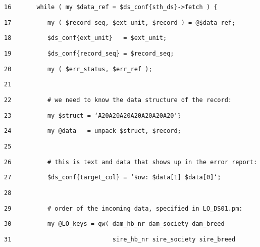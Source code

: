 \begin{table}[htbp]
\texttt{\scriptsize 16~~~~~~ while ( my \$data\_ref = \$ds\_conf\{sth\_ds\}->fetch
) \{}{\scriptsize \par}

\texttt{\scriptsize 17~~~~~~~~~ my ( \$record\_seq, \$ext\_unit,
\$record ) = @\$data\_ref;}{\scriptsize \par}

\texttt{\scriptsize 18~~~~~~~~~ \$ds\_conf\{ext\_unit\}~~
= \$ext\_unit;}{\scriptsize \par}

\texttt{\scriptsize 19~~~~~~~~~ \$ds\_conf\{record\_seq\}
= \$record\_seq;}{\scriptsize \par}

\texttt{\scriptsize 20~~~~~~~~~ my ( \$err\_status, \$err\_ref
);}{\scriptsize \par}

\texttt{\scriptsize 21 }{\scriptsize \par}

\texttt{\scriptsize 22~~~~~~~~~ \# we need to know the data
structure of the record:}{\scriptsize \par}

\texttt{\scriptsize 23~~~~~~~~~ my \$struct = \char`\"{}A20A20A20A20A20A20A20\char`\"{};}{\scriptsize \par}

\texttt{\scriptsize 24~~~~~~~~~ my @data~~ = unpack \$struct,
\$record;}{\scriptsize \par}

\texttt{\scriptsize 25 }{\scriptsize \par}

\texttt{\scriptsize 26~~~~~~~~~ \# this is text and data
that shows up in the error report:}{\scriptsize \par}

\texttt{\scriptsize 27~~~~~~~~~ \$ds\_conf\{target\_col\}
= \char`\"{}sow: \$data{[}1{]} \$data{[}0{]}\char`\"{};}{\scriptsize \par}

\texttt{\scriptsize 28 }{\scriptsize \par}

\texttt{\scriptsize 29~~~~~~~~~ \# order of the incoming
data, specified in LO\_DS01.pm:}{\scriptsize \par}

\texttt{\scriptsize 30~~~~~~~~~ my @LO\_keys = qw( dam\_hb\_nr
dam\_society dam\_breed}{\scriptsize \par}

\texttt{\scriptsize 31~~~~~~~~~~~~~~~~~~~~~~~~~~~
sire\_hb\_nr sire\_society sire\_breed}{\scriptsize \par}


\end{table}
